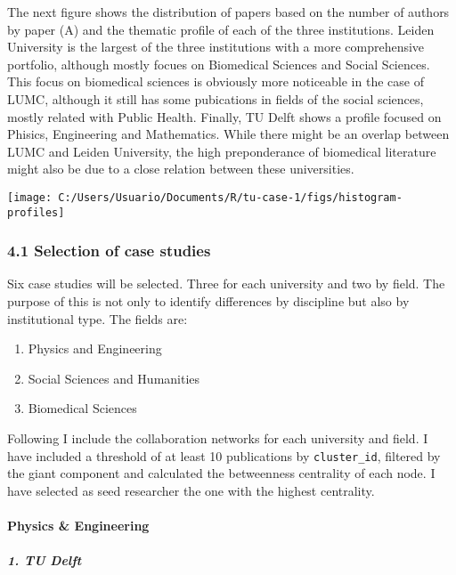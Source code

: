 \documentclass[]{article}
\providecommand{\tightlist}{%
  \setlength{\itemsep}{0pt}\setlength{\parskip}{0pt}}
\let\oldparagraph\paragraph
\renewcommand{\paragraph}[1]{\oldparagraph{#1}\mbox{}}
\let\oldsubparagraph\subparagraph
\renewcommand{\subparagraph}[1]{\oldsubparagraph{#1}\mbox{}}
\begin{document}
The next figure shows the distribution of papers based on the number of
authors by paper (A) and the thematic profile of each of the three
institutions. Leiden University is the largest of the three institutions
with a more comprehensive portfolio, although mostly focues on
Biomedical Sciences and Social Sciences. This focus on biomedical
sciences is obviously more noticeable in the case of LUMC, although it
still has some pubications in fields of the social sciences, mostly
related with Public Health. Finally, TU Delft shows a profile focused on
Phisics, Engineering and Mathematics. While there might be an overlap
between LUMC and Leiden University, the high preponderance of biomedical
literature might also be due to a close relation between these
universities.

\texttt{[image: C:/Users/Usuario/Documents/R/tu-case-1/figs/histogram-profiles]}

\hypertarget{selection-of-case-studies}{%
\subsubsection{4.1 Selection of case
studies}\label{selection-of-case-studies}}

Six case studies will be selected. Three for each university and two by
field. The purpose of this is not only to identify differences by
discipline but also by institutional type. The fields are:

\begin{enumerate}
\def\labelenumi{\arabic{enumi}.}
\tightlist
\item
  Physics and Engineering
\item
  Social Sciences and Humanities
\item
  Biomedical Sciences
\end{enumerate}

Following I include the collaboration networks for each university and
field. I have included a threshold of at least 10 publications by
\texttt{cluster\_id}, filtered by the giant component and calculated the
betweenness centrality of each node. I have selected as seed researcher
the one with the highest centrality.

\hypertarget{physics-engineering}{%
\paragraph{Physics \& Engineering}\label{physics-engineering}}

\hypertarget{tu-delft}{%
\subparagraph{1. TU Delft}\label{tu-delft}}
\end{document}

